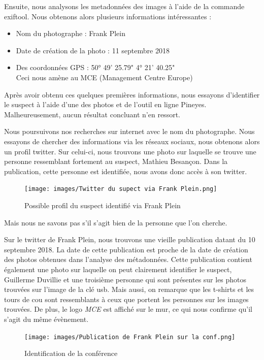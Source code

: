 \documentclass[a4paper]{article}
\begin{document}
Ensuite, nous analysons les metadonnées des images à l’aide de la commande exiftool.
Nous obtenons alors plusieurs informations intéressantes :
\begin{itemize}
    \item Nom du photographe : Frank Plein
    \item Date de création de la photo : 11 septembre 2018
    \item Des coordonnées GPS : 50° 49' 25.79"  4° 21' 40.25"\\
    Ceci nous amène au MCE (Management Centre Europe)
\end{itemize}
\newpage
Après avoir obtenu ces quelques premières informations, nous essayons d’identifier le suspect à l’aide d’une des photos et de l’outil en ligne Pineyes.
Malheureusement, aucun résultat concluant n’en ressort.

Nous poursuivons nos recherches sur internet avec le nom du photographe.
Nous essayons de chercher des informations via les réseaux sociaux, nous obtenons alors un profil twitter. Sur celui-ci, nous trouvons une photo sur laquelle se trouve une personne ressemblant fortement au suspect, Mathieu Besançon. Dans la publication, cette personne est identifiée, nous avons donc accès à son twitter.

\begin{figure}[H]
    \centering
    \texttt{[image: images/Twitter du supect via Frank Plein.png]}
    \caption{Possible profil du suspect identifié via Frank Plein}
    \label{possible_twitter_profile}
\end{figure}

Mais nous ne savons pas s’il s’agit bien de la personne que l’on cherche.

Sur le twitter de Frank Plein, nous trouvons une vieille publication datant du 10 septembre 2018.
La date de cette publication est proche de la date de création des photos obtenues dans l’analyse des métadonnées.
Cette publication contient également une photo sur laquelle on peut clairement identifier le suspect, Guillerme Duvillie et une troisième personne qui sont présentes sur les photos trouvées sur l’image de la clé usb.
Mais aussi, on remarque que les t-shirts et les tours de cou sont ressemblants à ceux que portent les personnes sur les images trouvées. De plus, le logo \emph{MCE} est affiché sur le mur, ce qui nous confirme qu'il s'agit du même évènement.

\begin{figure}[H]
    \centering
    \texttt{[image: images/Publication de Frank Plein sur la conf.png]}
    \caption{Identification de la conférence}
    \label{conference}
\end{figure}
\end{document}
